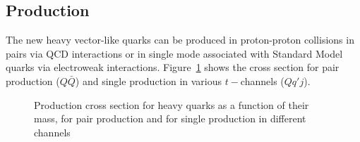 

\subsection{Production}\label{sec:vlqprod}

The new heavy vector-like quarks can be produced in
proton-proton collisions in pairs via QCD interactions
or in single mode associated with Standard Model quarks
via electroweak interactions.
Figure~\ref{fig:vlqxsec} shows the cross section for
pair production ($Q\bar{Q}$) and single production 
in various $t-$channels ($Qq'j$).

\begin{figure}[hbt]\begin{center}
	\caption{Production cross section for heavy quarks as 
          a function of their mass, for pair production and
          for single production in different 
          channels~\cite{Aguilar-Saavedra:2013qpa}\label{fig:vlqxsec}}
\end{center}\end{figure}

